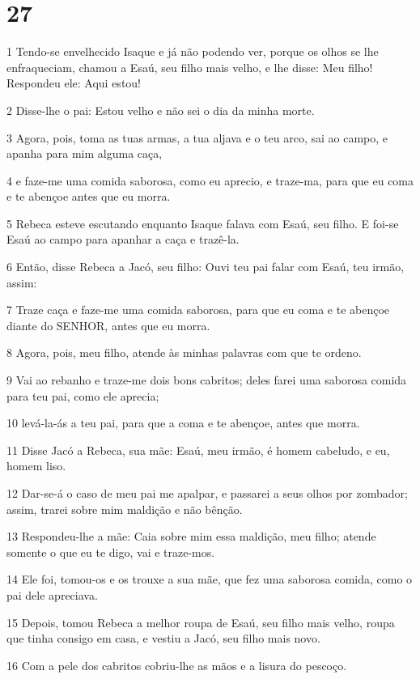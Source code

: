 \chapter{27}

\par 1 Tendo-se envelhecido Isaque e já não podendo ver, porque os olhos se lhe enfraqueciam, chamou a Esaú, seu filho mais velho, e lhe disse: Meu filho! Respondeu ele: Aqui estou!
\par 2 Disse-lhe o pai: Estou velho e não sei o dia da minha morte.
\par 3 Agora, pois, toma as tuas armas, a tua aljava e o teu arco, sai ao campo, e apanha para mim alguma caça,
\par 4 e faze-me uma comida saborosa, como eu aprecio, e traze-ma, para que eu coma e te abençoe antes que eu morra.
\par 5 Rebeca esteve escutando enquanto Isaque falava com Esaú, seu filho. E foi-se Esaú ao campo para apanhar a caça e trazê-la.
\par 6 Então, disse Rebeca a Jacó, seu filho: Ouvi teu pai falar com Esaú, teu irmão, assim:
\par 7 Traze caça e faze-me uma comida saborosa, para que eu coma e te abençoe diante do SENHOR, antes que eu morra.
\par 8 Agora, pois, meu filho, atende às minhas palavras com que te ordeno.
\par 9 Vai ao rebanho e traze-me dois bons cabritos; deles farei uma saborosa comida para teu pai, como ele aprecia;
\par 10 levá-la-ás a teu pai, para que a coma e te abençoe, antes que morra.
\par 11 Disse Jacó a Rebeca, sua mãe: Esaú, meu irmão, é homem cabeludo, e eu, homem liso.
\par 12 Dar-se-á o caso de meu pai me apalpar, e passarei a seus olhos por zombador; assim, trarei sobre mim maldição e não bênção.
\par 13 Respondeu-lhe a mãe: Caia sobre mim essa maldição, meu filho; atende somente o que eu te digo, vai e traze-mos.
\par 14 Ele foi, tomou-os e os trouxe a sua mãe, que fez uma saborosa comida, como o pai dele apreciava.
\par 15 Depois, tomou Rebeca a melhor roupa de Esaú, seu filho mais velho, roupa que tinha consigo em casa, e vestiu a Jacó, seu filho mais novo.
\par 16 Com a pele dos cabritos cobriu-lhe as mãos e a lisura do pescoço.
